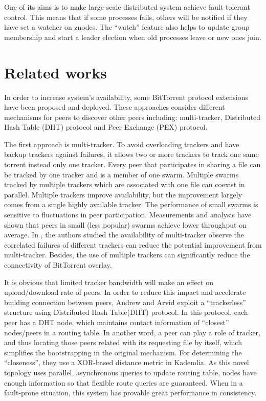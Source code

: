 \documentclass[conference]{IEEEtran}
\begin{document}
	One of its aims is to make large-scale distributed system achieve fault-tolerant control. This means that if some processes fails, others will be notified if they have set a watcher on znodes. The “watch” feature also helps to update group membership and start a leader election when old processes leave or new ones join.

	\section{Related works}
	In order to increase system's availability, some BitTorrent protocol extensions have been proposed and deployed. These approaches consider different mechanisms for peers to discover other peers including: multi-tracker, Distributed Hash Table (DHT) protocol and Peer Exchange (PEX) protocol.
	
	The first approach is multi-tracker. To avoid overloading trackers and have backup trackers against failures, it allows two or more trackers to track one same torrent instead only one tracker. Every peer that participates in sharing a file can be tracked by one tracker and is a member of one swarm. Multiple swarms tracked by multiple trackers which are associated with one file can coexist in parallel.  Multiple trackers improve availability, but the improvement largely comes from a single highly available tracker. The performance of small swarms is sensitive to fluctuations in peer participation. Measurements and analysis have shown that peers in small (less popular) swarms achieve lower throughput on average\cite{Swarming}. In \cite{Availability}, the authors studied the availability of multi-tracker observe the correlated failures of different trackers can reduce the potential improvement from multi-tracker. Besides, the use of multiple trackers can significantly reduce the connectivity of BitTorrent overlay.
	
	It is obvious that limited tracker bandwidth will make an effect on upload/download rate of peers. In order to reduce this impact and accelerate building connection between peers, Andrew and Arvid\cite{DHT} exploit a “trackerless” structure using Distributed Hash Table(DHT) protocol. In this protocol, each peer has a DHT node, which maintains contact information of “closest” nodes/peers in a routing table. In another word, a peer can play a role of tracker, and thus locating those peers related with its requesting file by itself, which simplifies the bootstrapping in the original mechanism. For determining the “closeness”, they use a XOR-based distance metric in Kademlia\cite{Kademlia}. As this novel topology uses parallel, asynchronous queries to update routing table, nodes have enough information so that flexible route queries are guaranteed. When in a fault-prone situation, this system has provable great performance in consistency.
	
\end{document}
